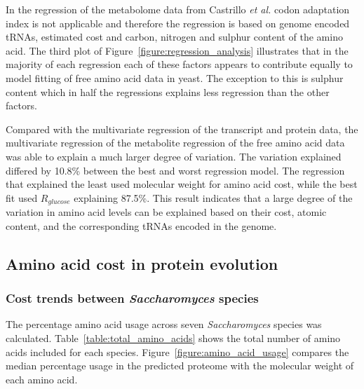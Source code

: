 In the regression of the metabolome data from Castrillo \emph{et al.} \cite{castrillo2007} codon adaptation index is not applicable and therefore the regression is based on genome encoded tRNAs, estimated cost and carbon, nitrogen and sulphur content of the amino acid. The third plot of Figure~\ref{figure:regression_analysis} illustrates that in the majority of each regression each of these factors appears to contribute equally to model fitting of free amino acid data in yeast. The exception to this is sulphur content which in half the regressions explains less regression than the other factors.

Compared with the multivariate regression of the transcript and protein data, the multivariate regression of the metabolite regression of the free amino acid data was able to explain a much larger degree of variation. The variation explained differed by 10.8\% between the best and worst regression model. The regression that explained the least used molecular weight for amino acid cost, while the best fit used $R_{glucose}$ explaining 87.5\%. This result indicates that a large degree of the variation in amino acid levels can be explained based on their cost, atomic content, and the corresponding tRNAs encoded in the genome.

\subsection{Amino acid cost in protein evolution}

\subsubsection{Cost trends between \emph{Saccharomyces} species}

The percentage amino acid usage across seven \emph{Saccharomyces} species was calculated. Table~\vref{table:total_amino_acids} shows the total number of amino acids included for each species. Figure~\vref{figure:amino_acid_usage} compares the median percentage usage in the predicted proteome with the molecular weight of each amino acid.

